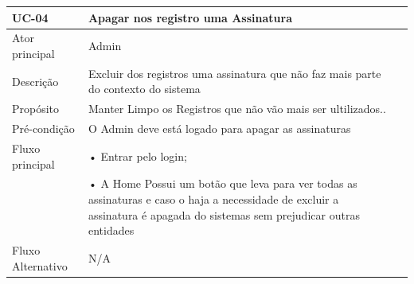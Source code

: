 \documentclass[a4paper,12pt]{article}
\begin{document}
\begin{table}[ht]
    \centering
    \begin{tabular}{|p{3.5cm}|p{10cm}|p{7cm}|}
        \hline
        \textbf{UC-04}                     & \textbf{Apagar nos registro  uma Assinatura}                                                                                                                              \\
        \hline

        \multirow{1}{*}{Ator principal}    & Admin                                                                                                                                                                     \\
        \hline
        \multirow{1}{*}{Descrição}         & Excluir dos registros uma assinatura que não faz mais parte do contexto do sistema                                                                                        \\
        \hline

        \multirow{1}{*}{Propósito}         & Manter Limpo os Registros que não vão mais ser ultilizados..                                                                                                              \\
        \hline

        \multirow{1}{*}{Pré-condição}      & O Admin deve está logado para apagar as assinaturas                                                                                                                       \\
        \hline

        \multirow{1}{*}{Fluxo principal}
                                           & • Entrar pelo login;                                                                                                                                                      \\
                                           & • A Home Possui um botão que leva para ver todas as assinaturas e caso o haja a necessidade de excluir a assinatura é apagada do sistemas sem prejudicar outras entidades \\
        \cline{2-2}
        \hline

        \multirow{1}{*}{Fluxo Alternativo} & N/A                                                                                                                                                                       \\
        \hline


\end{tabular}
\end{table}
\end{document}

